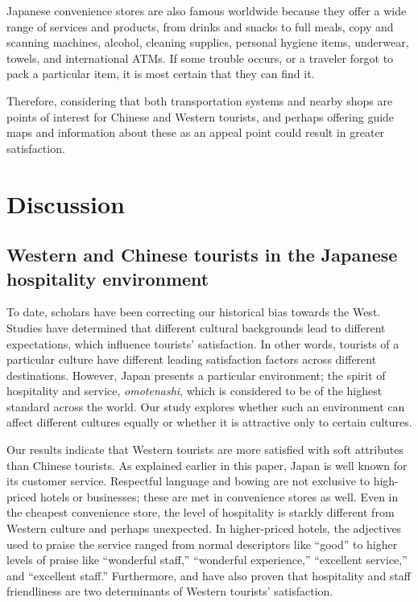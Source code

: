 \documentclass[smallextended,natbib]{svjour3}       %
\begin{document}
    Japanese convenience stores are also famous worldwide because they offer a wide range of services and products, from drinks and snacks to full meals, copy and scanning machines, alcohol, cleaning supplies, personal hygiene items, underwear, towels, and international ATMs. If some trouble occurs, or a traveler forgot to pack a particular item, it is most certain that they can find it. 

    Therefore, considering that both transportation systems and nearby shops are points of interest for Chinese and Western tourists, and perhaps offering guide maps and information about these as an appeal point could result in greater satisfaction.

\section{Discussion}\label{discussion}

  \subsection{Western and Chinese tourists in the Japanese hospitality environment}\label{disc:omotenashi}

    To date, scholars have been correcting our historical bias towards the West. Studies have determined that different cultural backgrounds lead to different expectations, which influence tourists' satisfaction. In other words, tourists of a particular culture have different leading satisfaction factors across different destinations. However, Japan presents a particular environment; the spirit of hospitality and service, \textit{omotenashi}, which is considered to be of the highest standard across the world. Our study explores whether such an environment can affect different cultures equally or whether it is attractive only to certain cultures.

    Our results indicate that Western tourists are more satisfied with soft attributes than Chinese tourists. As explained earlier in this paper, Japan is well known for its customer service. Respectful language and bowing are not exclusive to high-priced hotels or businesses; these are met in convenience stores as well. Even in the cheapest convenience store, the level of hospitality is starkly different from Western culture and perhaps unexpected. In higher-priced hotels, the adjectives used to praise the service ranged from normal descriptors like ``good'' to higher levels of praise like ``wonderful staff,'' ``wonderful experience,'' ``excellent service,'' and ``excellent staff.'' Furthermore, \cite{kozak2002} and \cite{shanka2004} have also proven that hospitality and staff friendliness are two determinants of Western tourists' satisfaction.
\end{document}
